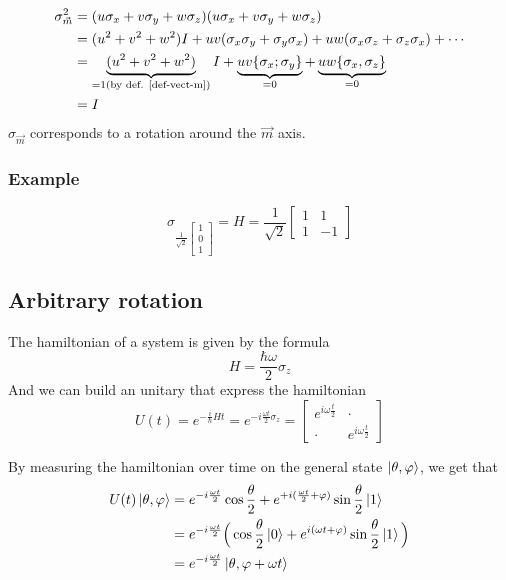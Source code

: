 \documentclass{article}
\begin{document}
\begin{equation}
    \begin{aligned}
        \sigma_{\vec{m}}^2
            & = (u\sigma_x + v\sigma_y + w\sigma_z)(u\sigma_x + v\sigma_y + w\sigma_z) \\
            & = (u^2 + v^2 + w^2)I + uv (\sigma_x\sigma_y + \sigma_y\sigma_x) + uw (\sigma_x\sigma_z + \sigma_z\sigma_x) + \cdots \\
            & = \underbrace{(u^2 + v^2 + w^2)}_{=1 (\text{by def. \ref{def-vect-m}})}I +
                \underbrace{uv\{\sigma_x; \sigma_y\}}_{=0} + \underbrace{uw\{\sigma_x, \sigma_z\}}_{=0} \\
            & = I
    \end{aligned}
\end{equation}
$\sigma_{\vec{m}}$ corresponds to a rotation around the $\vec{m}$ axis.

\subsubsection*{Example}
$$
\sigma_{\frac{1}{\sqrt{2}}\begin{bmatrix}1\\0\\1\end{bmatrix}} = H = \frac{1}{\sqrt{2}}
\begin{bmatrix}
    1 & 1 \\ 1 & -1
\end{bmatrix}
$$

\subsection{Arbitrary rotation}
The hamiltonian of a system is given by the formula
\begin{equation}
        H=\frac{\hbar\omega}{2}\sigma_z
\end{equation}
And we can build an unitary that express the hamiltonian
\begin{equation}
    U(t) = e^{-\frac{i}{\hbar}Ht}=e^{-i\frac{\omega t}{2}\sigma_z}
    = \begin{bmatrix}
        e^{i\omega\frac{t}{2}} & \cdot \\ \cdot & e^{i\omega\frac{t}{2}}
    \end{bmatrix}
\end{equation}

By measuring the hamiltonian over time on the general state $\ket{\theta, \varphi}$,
we get that
\begin{equation}
    \label{hamiltonian-on-general-state}
    \begin{aligned}
        U(t)\ket{\theta, \varphi}
            & = e^{-i\frac{\omega t}{2}}\cos\frac{\theta}{2} + e^{+i(\frac{\omega t}{2}+\varphi)}\sin\frac{\theta}{2}\ket{1} \\
            & = e^{-i\frac{\omega t}{2}}\Big(\cos\frac{\theta}{2}\ket{0} + e^{i(\omega t + \varphi)}\sin\frac{\theta}{2}\ket{1}\Big) \\
            & = e^{-i\frac{\omega t}{2}}\ket{\theta, \varphi + \omega t}    \end{aligned}
\end{equation}
\end{document}
